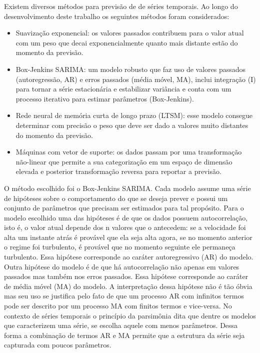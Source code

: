 \documentclass[
	12pt,				%
	openright,			%
	oneside,			%
	a4paper,			%
	english,			%
	french,				%
	spanish,			%
	brazil				%
	]{abntex2}
\begin{document}
Existem diversos métodos para previsão de de séries temporais. Ao longo do desenvolvimento deste trabalho os seguintes métodos foram considerados: 
\begin{itemize}
\item Suavização exponencial: os valores passados contribuem para o valor atual com um peso que decai exponencialmente quanto mais distante estão do momento da previsão.
\item Box-Jenkins SARIMA: um modelo robusto que faz uso de valores passados (autoregressão, AR) e erros passados (média móvel, MA), inclui integração (I) para tornar a série estacionária e estabilizar variância e conta com um processo iterativo para estimar parâmetros (Box-Jenkins).
\item Rede neural de memória curta de longo prazo (LTSM): esse modelo consegue determinar com precisão o peso que deve ser dado a valores muito distantes do momento da previsão.
\item Máquinas com vetor de suporte: os dados passam por uma transformação não-linear que permite a sua categorização em um espaço de dimensão elevada e posterior transformação reversa para reportar a previsão.
\end{itemize}

O método escolhido foi o Box-Jenkins SARIMA.
Cada modelo assume uma série de hipóteses sobre o comportamento do que se deseja prever e possui um conjunto de parâmetros que precisam ser estimados para tal propósito. Para o modelo escolhido uma das hipóteses é de que os dados possuem autocorrelação, isto é, o valor atual depende dos n valores que o antecedem: se a velocidade foi alta um instante atrás é provável que ela seja alta agora, se no momento anterior o regime foi turbulento, é provável que no momento seguinte ele permaneça turbulento. Essa hipótese corresponde ao caráter autoregressivo (AR) do modelo. Outra hipótese do modelo é de que há autocorrelação não apenas em valores passados mas também nos erros passados. Essa hipótese corresponde ao caráter de média móvel (MA) do modelo. A interpretação dessa hipótese não é tão óbvia mas seu uso se justifica pelo fato de que um processo AR com infinitos termos pode ser descrito por um processo MA com finitos termos e vice-versa. No contexto de séries temporais o princípio da parsimônia dita que dentre os modelos que  caracterizem uma série, se escolha aquele com menos parâmetros. Dessa forma a combinação de termos AR e MA permite que a estrutura da série seja capturada com poucos parâmetros.
\end{document}
